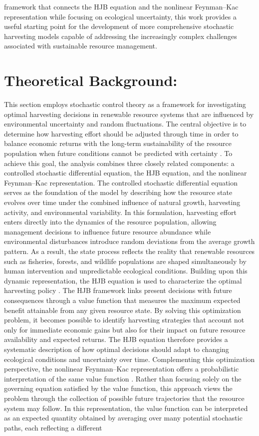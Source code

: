 \documentclass[11pt]{article}
\begin{document}
framework that connects the HJB equation and the nonlinear Feynman--Kac representation while focusing on ecological uncertainty, this work provides a useful starting point for the development of more comprehensive stochastic harvesting models capable of addressing the increasingly complex challenges associated with sustainable resource management.
	
	\section{Theoretical Background:}
	
	This section employs stochastic control theory as a framework for investigating optimal harvesting decisions in renewable resource systems that are influenced by environmental uncertainty and random fluctuations. The central objective is to determine how harvesting effort should be adjusted through time in order to balance economic returns with the long-term sustainability of the resource population when future conditions cannot be predicted with certainty \citep{pramanik2025optimal1,powell2025genomic}. To achieve this goal, the analysis combines three closely related components: a controlled stochastic differential equation, the HJB equation, and the nonlinear Feynman--Kac representation. The controlled stochastic differential equation serves as the foundation of the model by describing how the resource state evolves over time under the combined influence of natural growth, harvesting activity, and environmental variability. In this formulation, harvesting effort enters directly into the dynamics of the resource population, allowing management decisions to influence future resource abundance while environmental disturbances introduce random deviations from the average growth pattern. As a result, the state process reflects the reality that renewable resources such as fisheries, forests, and wildlife populations are shaped simultaneously by human intervention and unpredictable ecological conditions. Building upon this dynamic representation, the HJB equation is used to characterize the optimal harvesting policy \citep{pramanik2026strategic}. The HJB framework links present decisions with future consequences through a value function that measures the maximum expected benefit attainable from any given resource state. By solving this optimization problem, it becomes possible to identify harvesting strategies that account not only for immediate economic gains but also for their impact on future resource availability and expected returns. The HJB equation therefore provides a systematic description of how optimal decisions should adapt to changing ecological conditions and uncertainty over time. Complementing this optimization perspective, the nonlinear Feynman--Kac representation offers a probabilistic interpretation of the same value function \citep{pramanik2026quantum}. Rather than focusing solely on the governing equation satisfied by the value function, this approach views the problem through the collection of possible future trajectories that the resource system may follow. In this representation, the value function can be interpreted as an expected quantity obtained by averaging over many potential stochastic paths, each reflecting a different 
\end{document}
